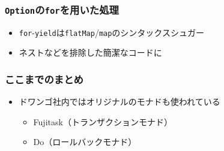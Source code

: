 \begin{frame}
  \frametitle{\protect\lstinline|Option|の\protect\lstinline|for|を用いた処理}


  \begin{itemize}
    \item<3-> \lstinline|for|-\lstinline|yield|は\lstinline|flatMap|/\lstinline|map|のシンタックスシュガー
    \item<4-> ネストなどを排除した簡潔なコードに
  \end{itemize}
\end{frame}

\begin{frame}
  \frametitle{ここまでのまとめ}

  \begin{center}
  \end{center}

  \begin{itemize}
    \item<3-> ドワンゴ社内ではオリジナルのモナドも使われている
    \begin{itemize}
      \item<4-> Fujitask（トランザクションモナド）\cite{fujitask,scalamatsuri2016,fujitasksimple}
      \item<4-> Do（ロールバックモナド）
    \end{itemize}
  \end{itemize}

  \begin{center}

  \end{center}  
\end{frame}

